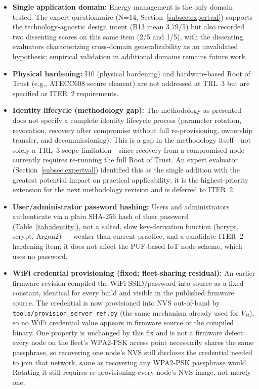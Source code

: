 \documentclass[preprint,12pt,authoryear]{elsarticle}
\begin{document}
\begin{sloppypar}
\begin{itemize}[leftmargin=*]
    \item \textbf{Single application domain:} Energy management is the only domain tested. The expert questionnaire (N=14, Section~\ref{subsec:expertval}) supports the technology-agnostic design intent (B13 mean 3.79/5) but also recorded two dissenting scores on this same item (2/5 and 1/5), with the dissenting evaluators characterizing cross-domain generalizability as an unvalidated hypothesis; empirical validation in additional domains remains future work.
    \item \textbf{Physical hardening:} I10 (physical hardening) and hardware-based Root of Trust (e.g., ATECC608 secure element) are not addressed at TRL~3 but are specified as ITER~2 requirements.
    \item \textbf{Identity lifecycle (methodology gap):} The methodology as presented does not specify a complete identity lifecycle process (parameter rotation, revocation, recovery after compromise without full re-provisioning, ownership transfer, and decommissioning). This is a gap in the methodology itself---not solely a TRL~3 scope limitation---since recovery from a compromised node currently requires re-running the full Root of Trust. An expert evaluator (Section~\ref{subsec:expertval}) identified this as the single addition with the greatest potential impact on practical applicability; it is the highest-priority extension for the next methodology revision and is deferred to ITER~2.
    \item \textbf{User/administrator password hashing:} Users and administrators authenticate via a plain SHA-256 hash of their password (Table~\ref{tab:identity}), not a salted, slow key-derivation function (bcrypt, scrypt, Argon2) --- weaker than current practice, and a candidate ITER~2 hardening item; it does not affect the PUF-based IoT node scheme, which uses no password.
    \item \textbf{WiFi credential provisioning (fixed; fleet-sharing residual):} An earlier firmware revision compiled the WiFi SSID/password into source as a fixed constant, identical for every build and visible in the published firmware source. The credential is now provisioned into NVS out-of-band by \texttt{tools/provision\_server\_ref.py} (the same mechanism already used for $V_B$), so no WiFi credential value appears in firmware source or the compiled binary. One property is unchanged by this fix and is not a firmware defect: every node on the fleet's WPA2-PSK access point necessarily shares the same passphrase, so recovering one node's NVS still discloses the credential needed to join that network, same as recovering any WPA2-PSK passphrase would. Rotating it still requires re-provisioning every node's NVS image, not merely one.

\end{itemize}
\end{sloppypar}
\end{document}
